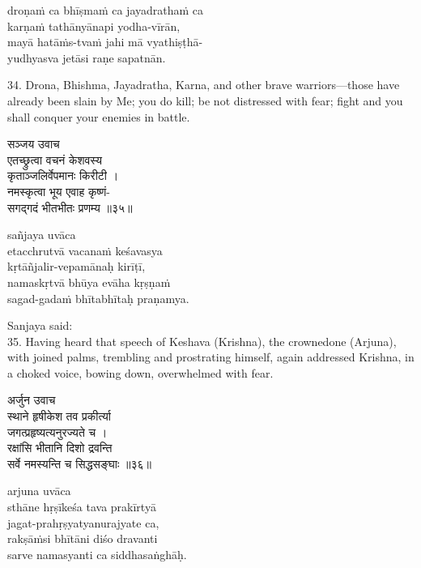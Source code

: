 \begin{transliteration}
droṇaṁ ca bhīṣmaṁ ca jayadrathaṁ ca \\
\tab karṇaṁ tathānyānapi yodha-vīrān, \\
mayā hatāṁs-tvaṁ jahi mā vyathiṣṭhā- \\
\tab yudhyasva jetāsi raṇe sapatnān.
\end{transliteration}

34. Drona, Bhishma, Jayadratha, Karna, and other brave warriors---those have
already been slain by Me; you do kill; be not distressed with fear; fight and
you shall conquer your enemies in battle.

\begin{gitaverse}
सञ्जय उवाच \\
एतच्छ्रुत्वा वचनं केशवस्य \\
\tab कृताञ्जलिर्वेपमानः किरीटी । \\
नमस्कृत्वा भूय एवाह कृष्णं- \\
\tab सगद्गदं भीतभीतः प्रणम्य ॥३५॥
\end{gitaverse}

\begin{transliteration}
sañjaya uvāca \\
etacchrutvā vacanaṁ keśavasya \\
\tab kṛtāñjalir-vepamānaḥ kirīṭī, \\
namaskṛtvā bhūya evāha kṛṣṇaṁ \\
\tab sagad-gadaṁ bhītabhītaḥ praṇamya.
\end{transliteration}

Sanjaya said: \\
35. Having heard that speech of Keshava (Krishna), the crownedone (Arjuna),
with joined palms, trembling and prostrating himself, again addressed Krishna,
in a choked voice, bowing down, overwhelmed with fear.

\begin{gitaverse}
अर्जुन उवाच \\
स्थाने हृषीकेश तव प्रकीर्त्या \\
\tab जगत्प्रहृष्यत्यनुरज्यते च । \\
रक्षांसि भीतानि दिशो द्रवन्ति \\
\tab सर्वे नमस्यन्ति च सिद्धसङ्घाः ॥३६॥
\end{gitaverse}

\begin{transliteration}
arjuna uvāca \\
sthāne hṛṣīkeśa tava prakīrtyā \\
\tab jagat-prahṛṣyatyanurajyate ca, \\
rakṣāṁsi bhītāni diśo dravanti \\
\tab sarve namasyanti ca siddhasaṅghāḥ.
\end{transliteration}

